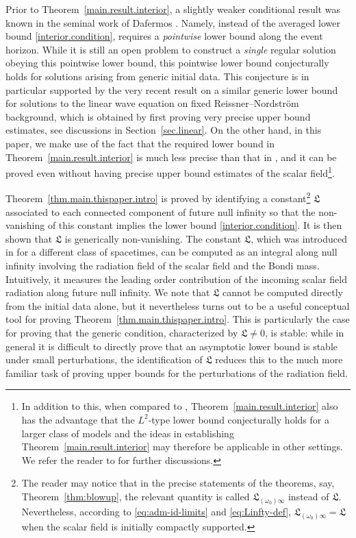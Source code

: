 \documentclass[10pt, reqno]{amsart}
\theoremstyle{definition}
\theoremstyle{remark}
\theoremstyle{conjecture}
\numberwithin{equation}{section}
\newcommand{\0}{\emptyset}
\newcommand{\omg}{\omega}
\begin{document}
Prior to Theorem~\ref{main.result.interior}, a slightly weaker conditional result was known in the seminal work of Dafermos \cite{D2}. Namely, instead of the averaged lower bound \eqref{interior.condition}, \cite{D2} requires a \emph{pointwise} lower bound along the event horizon. While it is still an open problem to construct a \emph{single} regular solution obeying this pointwise lower bound, this pointwise lower bound conjecturally holds for solutions arising from generic initial data. This conjecture is in particular supported by the very recent result \cite{AAG} on a similar generic lower bound for solutions to the linear wave equation on fixed Reissner--Nordstr\"om background, which is obtained by first proving very precise upper bound estimates, see discussions in Section~\ref{sec.linear}. On the other hand, in this paper, we make use of the fact that the required lower bound in Theorem~\ref{main.result.interior} is much less precise than that in \cite{D2}, and it can be proved even without having precise upper bound estimates of the scalar field\footnote{In addition to this, when compared to \cite{D2}, Theorem~\ref{main.result.interior} also has the advantage that the $L^2$-type lower bound conjecturally holds for a larger class of models and the ideas in establishing Theorem~\ref{main.result.interior} may therefore be applicable in other settings. We refer the reader to \cite{LO.interior} for further discussions.}.

Theorem~\ref{thm.main.thispaper.intro} is proved by identifying a constant\footnote{The reader may notice that in the precise statements of the theorems, say, Theorem~\ref{thm:blowup}, the relevant quantity is called $\mathfrak L_{(\omg_0)\infty}$ instead of $\mathfrak L$. Nevertheless, according to \eqref{eq:adm-id-limits} and \eqref{eq:Linfty-def}, $\mathfrak L_{(\omg_0)\infty}=\mathfrak L$ when the scalar field is initially compactly supported.} $\mathfrak L$ associated to each connected component of future null infinity so that the non-vanishing of this constant implies the lower bound \eqref{interior.condition}. It is then shown that $\mathfrak L$ is generically non-vanishing. The constant $\mathfrak L$, which was introduced in \cite{LO1} for a different class of spacetimes, can be computed as an integral along null infinity involving the radiation field of the scalar field and the Bondi mass. Intuitively, it measures the leading order contribution of the incoming scalar field radiation along future null infinity. We note that $\mathfrak L$ cannot be computed directly from the initial data alone, but it nevertheless turns out to be a useful conceptual tool for proving Theorem~\ref{thm.main.thispaper.intro}. This is particularly the case for proving that the generic condition, characterized by $\mathfrak L\neq 0$, is stable: while in general it is difficult to directly prove that an asymptotic lower bound is stable under small perturbations, the identification of $\mathfrak L$ reduces this to the much more familiar task of proving upper bounds for the perturbations of the radiation field. 
\end{document}
